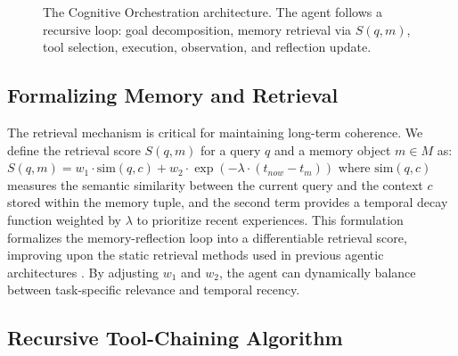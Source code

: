 \documentclass[11pt,a4paper]{article}
\begin{document}
\begin{figure}[h]
\centering
{}
\caption{The Cognitive Orchestration architecture. The agent follows a recursive loop: goal decomposition, memory retrieval via $S(q, m)$, tool selection, execution, observation, and reflection update.}
\end{figure}

\subsection{Formalizing Memory and Retrieval}

The retrieval mechanism is critical for maintaining long-term coherence. We define the retrieval score $S(q, m)$ for a query $q$ and a memory object $m \in M$ as: $S(q, m) = w_1 \cdot \text{sim}(q, c) + w_2 \cdot \exp(-\lambda \cdot (t_{now} - t_m))$ where $\text{sim}(q, c)$ measures the semantic similarity between the current query and the context $c$ stored within the memory tuple, and the second term provides a temporal decay function weighted by $\lambda$ to prioritize recent experiences. This formulation formalizes the memory-reflection loop into a differentiable retrieval score, improving upon the static retrieval methods used in previous agentic architectures \cite{park2023}. By adjusting $w_1$ and $w_2$, the agent can dynamically balance between task-specific relevance and temporal recency.

\subsection{Recursive Tool-Chaining Algorithm}
\end{document}
